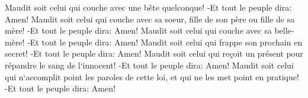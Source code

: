 \verse Maudit soit celui qui couche avec une bête quelconque! -Et tout le peuple dira: Amen! 
\verse Maudit soit celui qui couche avec sa soeur, fille de son père ou fille de sa mère! -Et tout le peuple dira: Amen! 
\verse Maudit soit celui qui couche avec sa belle-mère! -Et tout le peuple dira: Amen! 
\verse Maudit soit celui qui frappe son prochain en secret! -Et tout le peuple dira: Amen! 
\verse Maudit soit celui qui reçoit un présent pour répandre le sang de l`innocent! -Et tout le peuple dira: Amen! 
\verse Maudit soit celui qui n`accomplit point les paroles de cette loi, et qui ne les met point en pratique! -Et tout le peuple dira: Amen! 

\chapter{}

